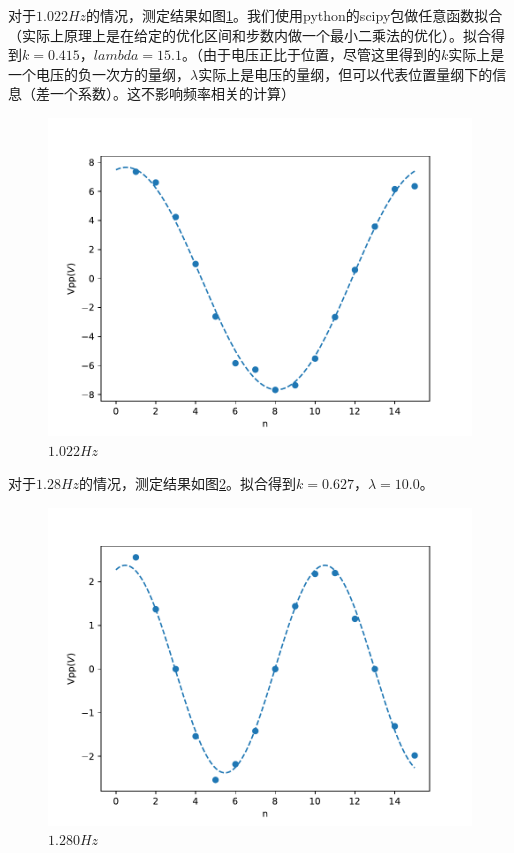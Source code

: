 \documentclass[fleqn,10pt]{SelfArx} %
\begin{document}
对于$1.022Hz$的情况，测定结果如图\ref{fig:1022}。我们使用python的scipy包做任意函数拟合（实际上原理上是在给定的优化区间和步数内做一个最小二乘法的优化）。拟合得到$k=0.415$，$lambda=15.1$。（由于电压正比于位置，尽管这里得到的$k$实际上是一个电压的负一次方的量纲，$\lambda$实际上是电压的量纲，但可以代表位置量纲下的信息（差一个系数）。这不影响频率相关的计算）

\begin{figure}[htbp]
	\centering
	\includegraphics[width=\linewidth]{1022.pdf}
	\caption{$1.022Hz$}
	\label{fig:1022}
\end{figure}

对于$1.28Hz$的情况，测定结果如图\ref{fig:1280}。拟合得到$k=0.627$，$\lambda=10.0$。

\begin{figure}[htbp]
	\centering
	\includegraphics[width=\linewidth]{1280.pdf}
	\caption{$1.280Hz$}
	\label{fig:1280}
\end{figure}
\end{document}
